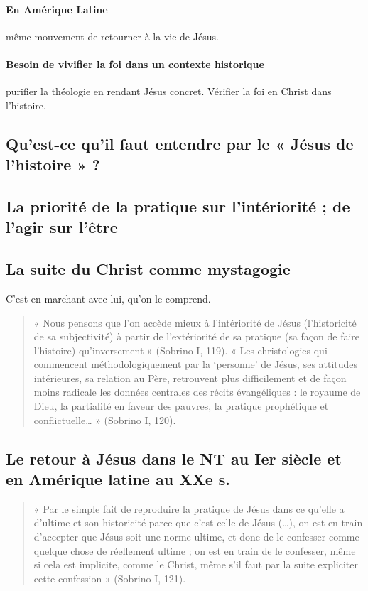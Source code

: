 \paragraph{En Amérique Latine} même mouvement de retourner à la vie de Jésus. 


\paragraph{Besoin de vivifier la foi dans un contexte historique} purifier la théologie en rendant Jésus concret. Vérifier la foi en Christ dans l'histoire.


\subsection{Qu’est-ce qu’il faut entendre par le « Jésus de l’histoire » ?}


\subsection{La priorité de la pratique sur l’intériorité ; de l’agir sur l’être}


\subsection{La suite du Christ comme mystagogie}
C'est en marchant avec lui, qu'on le comprend. 

\begin{quote}
    « Nous pensons que l’on accède mieux à l’intériorité de Jésus (l’historicité de sa subjectivité) à partir
de l’extériorité de sa pratique (sa façon de faire l’histoire) qu’inversement » (Sobrino I, 119). « Les
christologies qui commencent méthodologiquement par la ‘personne’ de Jésus, ses attitudes
intérieures, sa relation au Père, retrouvent plus difficilement et de façon moins radicale les données
centrales des récits évangéliques : le royaume de Dieu, la partialité en faveur des pauvres, la pratique
prophétique et conflictuelle… » (Sobrino I, 120).
\end{quote}

\subsection{Le retour à Jésus dans le NT au Ier siècle et en Amérique latine au XXe s.}

\begin{quote}
    « Par le simple fait de reproduire la pratique de Jésus dans ce qu’elle a d’ultime et son historicité parce
que c’est celle de Jésus (…), on est en train d’accepter que Jésus soit une norme ultime, et donc de le
confesser comme quelque chose de réellement ultime ; on est en train de le confesser, même si cela est
implicite, comme le Christ, même s’il faut par la suite expliciter cette confession » (Sobrino I, 121).
\end{quote}


